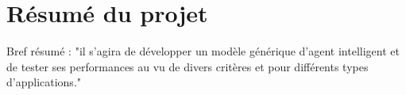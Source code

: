 \chapter{Résumé du projet}
Bref résumé : "il s'agira de développer un modèle générique d'agent intelligent et de tester ses performances
au vu de divers critères et pour différents types d'applications." 


\clearpage
